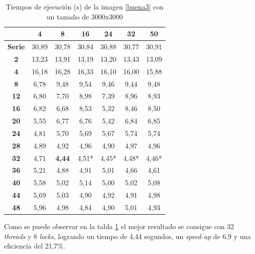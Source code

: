 \begin{table}[H]
	\centering
	\small
	\begin{tabular}{|c|c|c|c|c|c|c|}
		\hline
		{\bf \backslashbox{Threads}{Locks}}   & {\bf 4} & {\bf 8} & {\bf 16} & {\bf 24} & {\bf 32} & {\bf 50} \\ \hline
		{\bf Serie}  & 30,89   & 30,78   & 30,84    & 30,88    & 30,77    & 30,91    \\ \hline
		{\bf 2}  & 13,23   & 13,91   & 13,19    & 13,20    & 13,43    & 13,09    \\ \hline
		{\bf 4}  & 16,18   & 16,28   & 16,33    & 16,10    & 16,00    & 15,88    \\ \hline
		{\bf 8}  & 6,78    & 9,48    & 9,54     & 9,46     & 9,44     & 9,48     \\ \hline
		{\bf 12} & 6,80    & 7,70    & 8,98     & 7,39     & 8,96     & 8,93     \\ \hline
		{\bf 16} & 6,82    & 6,68    & 8,53     & 5,32     & 8,46     & 8,50     \\ \hline
		{\bf 20} & 5,55    & 6,77    & 6,76     & 5,42     & 6,84     & 6,85     \\ \hline
		{\bf 24} & 4,81    & 5,70    & 5,69     & 5,67     & 5,74     & 5,74     \\ \hline
		{\bf 28} & 4,89    & 4,92    & 4,96     & 4,90     & 4,97     & 4,96     \\ \hline
		{\bf 32} & 4,71    & \textbf{4,44}    & 4,51*     & 4,45*     & 4,48*     & 4,46*     \\ \hline
		{\bf 36} & 5,21    & 4,88    & 4,91     & 5,01     & 4,66     & 4,61     \\ \hline
		{\bf 40} & 5,58    & 5,02    & 5,14     & 5,00     & 5,02     & 5,08     \\ \hline
		{\bf 44} & 5,69    & 5,03    & 4,90     & 4,92     & 4,91     & 4,98     \\ \hline
		{\bf 48} & 5,96    & 4,98    & 4,84     & 4,90     & 5,01     & 4,93     \\ \hline
	\end{tabular}
	\captionsetup{justification=centering}	
	\caption{Tiempos de ejecuci\'{o}n (s) de la imagen \ref{buena3} con un tama\~{n}o de 3000x3000}
	\label{img3-3000}
\end{table}

Como se puede observar en la tabla \ref{img3-3000} el mejor resultado se consigue con 32 \textit{threads} y 8 \textit{locks}, logrando un tiempo de 4,44 segundos, un \textit{speed-up} de 6,9 y una eficiencia del 21,7\%.


